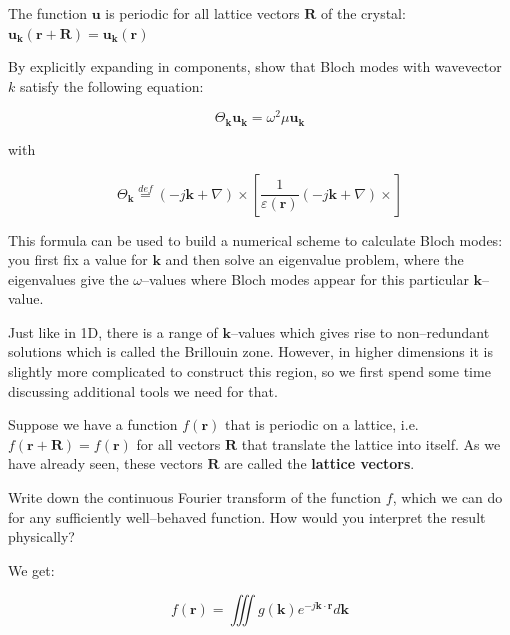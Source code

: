 The function ${\mathbf u}$ is periodic for all lattice vectors ${\mathbf R}$ of the crystal: ${\mathbf u}_{\mathbf k} ({\mathbf r} + {\mathbf R})  = {\mathbf u}_{\mathbf k} ({\mathbf r})$


\begin{exer}
By explicitly expanding in components, show that Bloch modes with wavevector $k$ satisfy the following equation:

$$\Theta_{\mathbf k} {\mathbf u}_{\mathbf k} = \omega^2 \mu {\mathbf u}_{\mathbf k}$$

with

$$\Theta_{\mathbf k} \stackrel{def}{=} (-j {\mathbf k} + \nabla) \times \left [ \frac{1}{\varepsilon({\mathbf r})}(-j{\mathbf k} +\nabla) \times \right ]$$

This formula can be used to build a numerical scheme to calculate Bloch modes: you first fix a value for ${\mathbf k}$ and then solve an eigenvalue problem, where the eigenvalues give the $\omega$--values where Bloch modes appear for this particular ${\mathbf k}$--value.

\end{exer}

Just like in 1D, there is a range of ${\mathbf k}$--values which gives rise to non--redundant solutions which is called the Brillouin zone. However, in higher dimensions it is slightly more complicated to construct this region, so we first spend some time discussing additional tools we need for that.

\pagebreak


Suppose we have a function $f({\mathbf r})$ that is periodic on a lattice, i.e. $f({\mathbf r} + {\mathbf R}) = f({\mathbf r})$ for all vectors ${\mathbf R}$ that translate the lattice into itself. As we have already seen, these vectors ${\mathbf R}$ are called the \textbf{lattice vectors}.

\begin{cue}
  Write down the continuous Fourier transform of the function $f$, which we can do for any sufficiently well--behaved function. How would you interpret the result physically?
\end{cue}

We get:

\begin{equation}
f({\mathbf r}) = \iiint g({\mathbf k}) e ^ {-j {\mathbf k} \cdot {\mathbf r}} d{\mathbf k}
\end{equation} 

